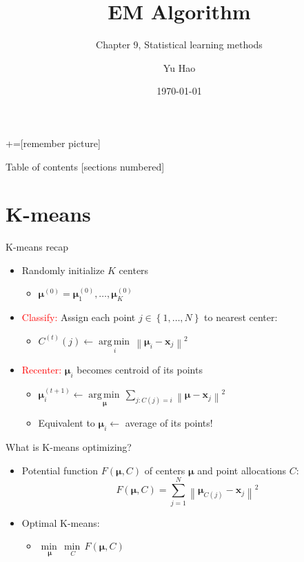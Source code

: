 \documentclass[11.5pt]{beamer}
\title{EM Algorithm}
\subtitle{Chapter 9, Statistical learning methods}
\date{\today}
\author{Yu Hao}
\institute{NaMI, Tongji University}
\newcommand{\norm}[1]{\left\lVert#1\right\rVert}
\newcommand{\argmin}[1]{\underset{#1}{\operatorname*{arg\,min\,}}}
\newcommand{\undermin}[1]{\underset{#1}{\operatorname*{min\,}}}
\begin{document}
+=[remember picture]
\everymath{\displaystyle}

\maketitle

\begin{frame}{Table of contents}
[sections numbered]
\tableofcontents[hideallsubsections]
\end{frame}

\section{K-means}
\begin{frame}{K-means recap}
\begin{itemize}
	\item Randomly initialize $K$ centers 
	\begin{itemize}
		\item $\bm{\mu}^{(0)}=\bm{\mu}_{1}^{(0)},\ldots,\bm{\mu}_{K}^{(0)}$
	\end{itemize}
	\item \textcolor{red}{Classify:} Assign each point $j\in{\left\{ 1,\ldots,N \right\}}$ to nearest center:
	\begin{itemize}
		\item $C^{(t)}(j) \leftarrow \argmin{i} \norm{\bm{\mu}_i-\bm{x}_j}^2$
	\end{itemize}
	\item \textcolor{red}{Recenter:} $\bm{\mu}_i$ becomes centroid of its points
	\begin{itemize}
		\item $\bm{\mu}_{i}^{(t+1)}\leftarrow\argmin{\bm{\mu}}\sum_{j: C(j)=i} \norm{\bm{\mu}-\bm{x}_{j}}^2$
		\item Equivalent to $\bm{\mu}_i \leftarrow$ average of its points!
	\end{itemize}
\end{itemize}
\end{frame}

\begin{frame}{What is K-means optimizing?}
\begin{itemize}
	\item Potential function $F(\bm{\mu},C)$ of centers $\bm{\mu}$ and point allocations $C$:
	\begin{equation}
	F(\bm{\mu},C)=\sum_{j=1}^{N} \norm{\bm{\mu}_{C(j)}-\bm{x}_j}^2
	\end{equation}
	\item Optimal K-means:
	\begin{itemize}
		\item $\undermin{\bm{\mu}}\undermin{C}F(\bm{\mu},C)$
	\end{itemize}
\end{itemize}
\end{frame}
\end{document}
